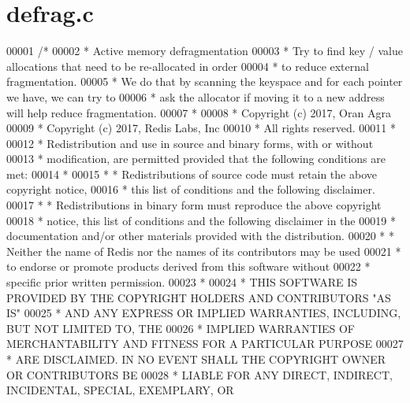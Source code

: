 \hypertarget{defrag_8c_source}{}\section{defrag.\+c}
\label{defrag_8c_source}

\begin{DoxyCode}
00001 \textcolor{comment}{/* }
00002 \textcolor{comment}{ * Active memory defragmentation}
00003 \textcolor{comment}{ * Try to find key / value allocations that need to be re-allocated in order }
00004 \textcolor{comment}{ * to reduce external fragmentation.}
00005 \textcolor{comment}{ * We do that by scanning the keyspace and for each pointer we have, we can try to}
00006 \textcolor{comment}{ * ask the allocator if moving it to a new address will help reduce fragmentation.}
00007 \textcolor{comment}{ *}
00008 \textcolor{comment}{ * Copyright (c) 2017, Oran Agra}
00009 \textcolor{comment}{ * Copyright (c) 2017, Redis Labs, Inc}
00010 \textcolor{comment}{ * All rights reserved.}
00011 \textcolor{comment}{ *}
00012 \textcolor{comment}{ * Redistribution and use in source and binary forms, with or without}
00013 \textcolor{comment}{ * modification, are permitted provided that the following conditions are met:}
00014 \textcolor{comment}{ *}
00015 \textcolor{comment}{ *   * Redistributions of source code must retain the above copyright notice,}
00016 \textcolor{comment}{ *     this list of conditions and the following disclaimer.}
00017 \textcolor{comment}{ *   * Redistributions in binary form must reproduce the above copyright}
00018 \textcolor{comment}{ *     notice, this list of conditions and the following disclaimer in the}
00019 \textcolor{comment}{ *     documentation and/or other materials provided with the distribution.}
00020 \textcolor{comment}{ *   * Neither the name of Redis nor the names of its contributors may be used}
00021 \textcolor{comment}{ *     to endorse or promote products derived from this software without}
00022 \textcolor{comment}{ *     specific prior written permission.}
00023 \textcolor{comment}{ *}
00024 \textcolor{comment}{ * THIS SOFTWARE IS PROVIDED BY THE COPYRIGHT HOLDERS AND CONTRIBUTORS "AS IS"}
00025 \textcolor{comment}{ * AND ANY EXPRESS OR IMPLIED WARRANTIES, INCLUDING, BUT NOT LIMITED TO, THE}
00026 \textcolor{comment}{ * IMPLIED WARRANTIES OF MERCHANTABILITY AND FITNESS FOR A PARTICULAR PURPOSE}
00027 \textcolor{comment}{ * ARE DISCLAIMED. IN NO EVENT SHALL THE COPYRIGHT OWNER OR CONTRIBUTORS BE}
00028 \textcolor{comment}{ * LIABLE FOR ANY DIRECT, INDIRECT, INCIDENTAL, SPECIAL, EXEMPLARY, OR}

\end{DoxyCode}
